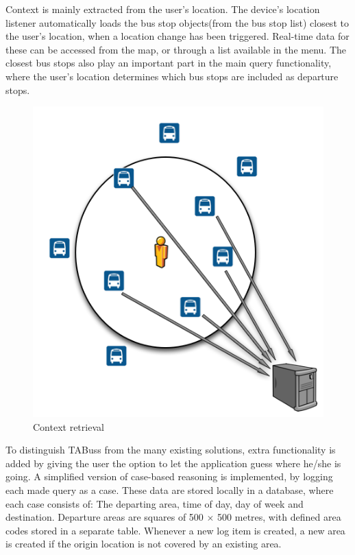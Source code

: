 Context is mainly extracted from the user's location. The device's location listener automatically loads the bus stop objects(from the bus stop list) closest to the user's location, when a location change has been triggered. Real-time data for these can be accessed from the map, or through a list available in the menu. The closest bus stops also play an important part in the main query functionality, where the user's location determines which bus stops are included as departure stops.
\setlength{\intextsep}{0pt}
\begin{figure}
  \begin{center}
    \includegraphics[scale=0.3]{Method/enfigur.png}

  \end{center}
  \caption{Context retrieval}
\end{figure}
\setlength{\intextsep}{3pt}
To distinguish TABuss from the many existing solutions, extra functionality is added by giving the user the option to let the application guess where he/she is going. A simplified version of case-based reasoning \cite{aam} is implemented, by logging each made query as a case. These data are stored locally in a database, where each case consists of: The departing area, time of day, day of week and destination. Departure areas are squares of 500 $\times$ 500 metres, with defined area codes stored in a separate table. Whenever a new log item is created, a new area is created if the origin location is not covered by an existing area.

